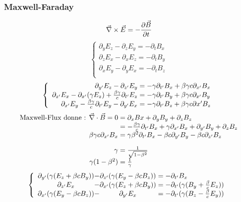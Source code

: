\subsubsection*{Maxwell-Faraday}
$$
	\vec{\nabla}\times\vec{E}=-\frac{\partial \vec{B}}{\partial t}
$$
$$
	\left\{ \begin{array}{l}
		\partial_yE_z-\partial_zE_y=-\partial_tB_x\\
		\partial_zE_x-\partial_xE_z=-\partial_tB_y\\
		\partial_xE_y-\partial_yE_x=-\partial_tB_z\\
	\end{array} \right.
$$
$$
	\left\{
	\begin{array}{r@{\;}l}
		\partial_{y'}E_z-\partial_{z'}E_y&=-\gamma\partial_{t'}B_x+\beta\gamma c\partial_{x'}B_x\\
		\partial_{z'}E_x-\partial_{x'}(\gamma E_z)+\frac{\beta\gamma}{c}\partial_{t'}E_z&=-\gamma\partial_{t'}B_y+\beta\gamma c\partial_{x'}B_y\\
		\partial_{x'}E_y-\frac{\beta\gamma}{c}\partial_{t'}E_y-\partial_{y'}E_x&=-\gamma\partial_{t'}B_z+\beta\gamma c\partial{x'}B_z\\
	\end{array} \right.
$$
$$
	\begin{array}{r@{\;}l}
		\text{Maxwell-Flux donne : }{\nab}\cdot\vec{B}=0&=\partial_xBx+\partial_yB_y+\partial_zB_z\\
		&=-\frac{\beta\gamma}{c}\partial_{t'}B_x+\gamma\partial_{x'}B_x+\partial_{y'}B_y+\partial_zB_z\\
		\beta\gamma c\partial_{x'}B_x&=\gamma\beta^2\partial_{t'}B_x-\beta c\partial_{y'}B_y-\beta c\partial_{z'}B_z\\[10pt]\indent
		\gamma&=\frac{1}{\sqrt{1-\beta^2}}\\
		\gamma(1-\beta^2)&=\frac{1}{\gamma}
	\end{array}
$$
$$
	\left\{
	\begin{array}{c@{-}c@{\;}l}
		\partial_{y'}(\gamma(E_z+\beta cB_y))&\partial_{z'}(\gamma(E_y-\beta cB_z))&=-\partial_{t'}B_x\\
		\partial_{z'}E_x&\partial_{x'}(\gamma(E_z+\beta cB_y))&=-\partial_{t'}(\gamma(B_y+\frac{\beta}{c}E_z))\\
		\partial_{x'}(\gamma(E_y-\beta cB_z))&\partial_{y'}E_x&=-\partial_{t'}(\gamma(B_z-\frac{\beta}{c}E_y))\\
	\end{array} \right.\\
$$


